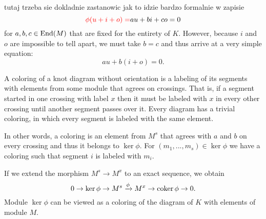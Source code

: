 {\color{yellow}tutaj trzeba sie dokladnie zastanowic jak to idzie bardzo formalnie w zapisie
$${\color{red}\phi(u+i+o)=}au+bi+co=0$$
for $a, b, c\in \operatorname{End}(M)$ that are fixed for the entirety of $K$. However, because $i$ and $o$ are impossible to tell apart, we must take $b=c$ and thus arrive at a very simple equation:
$$au+b(i+o)=0.$$
}

A coloring of a knot diagram without orientation is a labeling of its segments with elements from some module that agrees on crossings. That is, if a segment started in one crossing with label $x$ then it must be labeled with $x$ in every other crossing until another segment passes over it. Every diagram has a trivial coloring, in which every segment is labeled with the same element.

In other words, a coloring is an element from $M^s$ that agrees with $a$ and $b$ on every crossing and thus it belongs to $\ker\phi$. For $(m_1,...,m_s)\in\ker\phi$ we have a coloring such that segment $i$ is labeled with $m_i$.

{\color{yellow}If we extend the morphism $M^s\to M^x$ to an exact sequence, we obtain
$$0\to \ker\phi\to M^s\xrightarrow{\phi}M^x\to \operatorname{coker}\phi\to 0.$$
Module $\ker\phi$ can be viewed as a coloring of the diagram of $K$ with elements of module $M$.}


